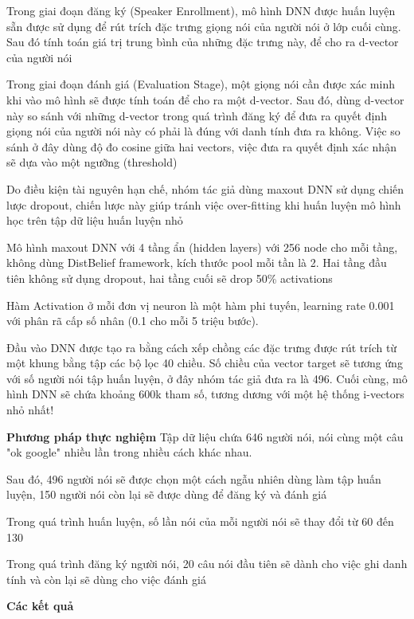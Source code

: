 \documentclass{article}
\begin{document}
	Trong giai đoạn đăng ký (Speaker Enrollment), mô hình DNN được huấn luyện sẵn được sử dụng để rút trích đặc trưng giọng nói của người nói ở lớp cuối cùng. Sau đó tính toán giá trị trung bình của những đặc trưng này, để cho ra d-vector của người nói

	Trong giai đoạn đánh giá (Evaluation Stage), một giọng nói cần được xác minh khi vào mô hình sẽ được tính toán để cho ra một d-vector. Sau đó, dùng d-vector này so sánh với những d-vector trong quá trình đăng ký để đưa ra quyết định giọng nói của người nói này có phải là đúng với danh tính đưa ra không. Việc so sánh ở đây dùng độ đo cosine giữa hai vectors, việc đưa ra quyết định xác nhận sẽ dựa vào một ngưỡng (threshold)
	
	Do điều kiện tài nguyên hạn chế, nhóm tác giả dùng maxout DNN sử dụng chiến lược dropout, chiến lược này giúp tránh việc over-fitting khi huấn luyện mô hình học trên tập dữ liệu huấn luyện nhỏ
	
	Mô hình maxout DNN với 4 tầng ẩn (hidden layers) với 256 node cho mỗi tầng, không dùng DistBelief framework, kích thước pool mỗi tần là 2. Hai tầng đầu tiên không sử dụng dropout, hai tầng cuối sẽ drop 50\% activations
	
	Hàm Activation ở mỗi đơn vị neuron là một hàm phi tuyến, learning rate 0.001 với phân rã cấp số nhân (0.1 cho mỗi 5 triệu bước).
	
	Đầu vào DNN được tạo ra bằng cách xếp chồng các đặc trưng được rút trích từ một khung bằng tập các bộ lọc 40 chiều. Số chiều của vector target sẽ tương ứng với số người nói tập huấn luyện, ở đây nhóm tác giả đưa ra là 496. Cuối cùng, mô hình DNN sẽ chứa khoảng 600k tham số, tương dương với một hệ thống i-vectors nhỏ nhất!
	
	\textbf{Phương pháp thực nghiệm}
	Tập dữ liệu chứa 646 người nói, nói cùng một câu "ok google" nhiều lần trong nhiều cách khác nhau.
	
	Sau đó, 496 người nói sẽ được chọn một cách ngẫu nhiên dùng làm tập huấn luyện, 150 người nói còn lại sẽ được dùng để đăng ký và đánh giá
	
	Trong quá trình huấn luyện, số lần nói của mỗi người nói sẽ thay đổi từ 60 đến 130
	
	Trong quá trình đăng ký người nói, 20 câu nói đầu tiên sẽ dành cho việc ghi danh tính và còn lại sẽ dùng cho việc đánh giá
		
	\textbf{Các kết quả}
	
\end{document}

